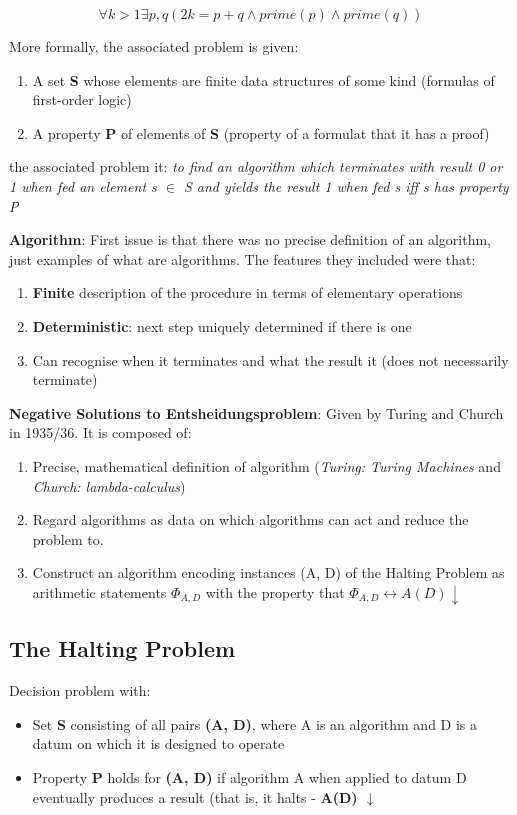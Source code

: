 \documentclass{article}
\begin{document}
\begin{equation}
    \forall k>1 \exists p, q(2k=p+q \wedge prime(p) \wedge prime(q))
\end{equation}

More formally, the associated problem is given:
\begin{enumerate}
    \item A set \textbf{S} whose elements are finite data structures of some kind (formulas of first-order logic)
    \item A property \textbf{P} of elements of \textbf{S} (property of a formulat that it has a proof)
\end{enumerate}
the associated problem it: \textit{to find an algorithm which terminates with result 0 or 1 when fed an element s $\in$ S and yields the result 1 when fed s iff s has property P}

\bigskip
\noindent
\textbf{Algorithm}: First issue is that there was no precise definition of an algorithm, just examples of what are algorithms. The features they included were that:
\begin{enumerate}
    \item \textbf{Finite} description of the procedure in terms of elementary operations
    \item \textbf{Deterministic}: next step uniquely determined if there is one
    \item Can recognise when it terminates and what the result it (does not necessarily terminate)
\end{enumerate}

\bigskip
\noindent
\textbf{Negative Solutions to Entsheidungsproblem}: Given by Turing and Church in 1935/36. It is composed of:
\begin{enumerate}
    \item Precise, mathematical definition of algorithm (\textit{Turing: Turing Machines} and \textit{Church: lambda-calculus})
    \item Regard algorithms as data on which algorithms can act and reduce the problem to.
    \item Construct an algorithm encoding instances (A, D) of the Halting Problem as arithmetic statements $\Phi_{A, D}$ with the property that $\Phi_{A, D} \leftrightarrow A(D)\downarrow$
\end{enumerate}

\subsection{The Halting Problem}
Decision problem with:
\begin{itemize}
    \item Set \textbf{S} consisting of all pairs \textbf{(A, D)}, where A is an algorithm and D is a datum on which it is designed to operate
    \item Property \textbf{P} holds for \textbf{(A, D)} if algorithm A when applied to datum D eventually produces a result (that is, it halts - \textbf{A(D) $\downarrow$}
\end{itemize}
\end{document}
